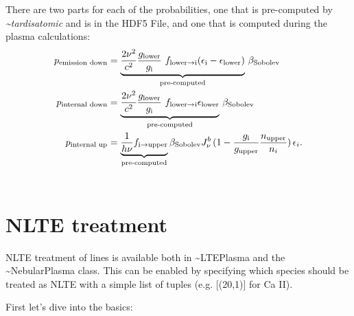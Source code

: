 \documentclass[letterpaper,10pt,english]{sphinxmanual}
\begin{document}
There are two parts for each of the probabilities, one that is pre-computed by \emph{\textasciitilde{}tardisatomic} and is in the HDF5 File,
and one that is computed during the plasma calculations:
\begin{gather}
\begin{split}p_\textrm{emission down}&= \underbrace{\frac{2\nu^2}{c^2} \frac{g_\textrm{lower}}{g_\textrm{i}}~f_{\textrm{lower}\rightarrow\textrm{i}}
                                   (\epsilon_\textrm{i} - \epsilon_\textrm{lower})}_\textrm{pre-computed}
                                   \,\beta_\textrm{Sobolev}\\
p_\textrm{internal down} &= \underbrace{\frac{2\nu^2}{c^2} \frac{g_\textrm{lower}}{g_\textrm{i}}~f_{\textrm{lower}\rightarrow\textrm{i}}
                                   \epsilon_\textrm{lower}}_\textrm{pre-computed}\,\beta_\textrm{Sobolev}\\
p_\textrm{internal up} &= \underbrace{\frac{1}{h\nu} f_{\textrm{i}\rightarrow\textrm{upper}}}_\textrm{pre-computed}
                                                \beta_\textrm{Sobolev} J_{\nu}^{b}\,
                                                (1-\frac{g_\textrm{i}}{g_\textrm{upper}}\frac{n_\textrm{upper}}{n_i})
                                                \,\epsilon_{i}.\end{split}\notag\\\begin{split}\end{split}\notag
\end{gather}

\section{NLTE treatment}
\label{plasma:nlte-treatment}
NLTE treatment of lines is available both in \textasciitilde{}LTEPlasma and the \textasciitilde{}NebularPlasma class. This can be enabled by specifying
which species should be treated as NLTE with a simple list of tuples (e.g. {[}(20,1){]} for Ca II).

First let's dive into the basics:
\end{document}
